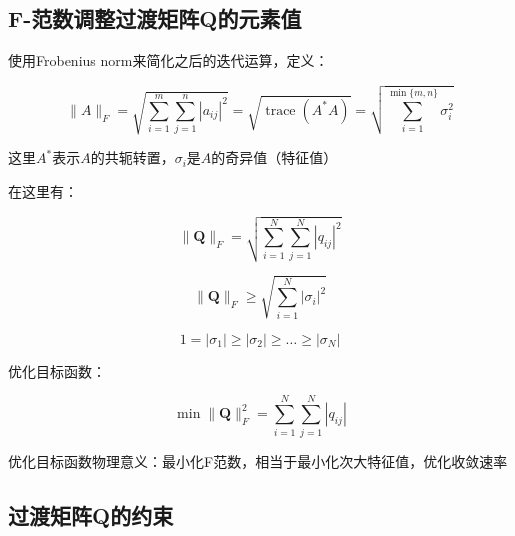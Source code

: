 \subsection{F-范数调整过渡矩阵Q的元素值}


使用Frobenius norm来简化之后的迭代运算，定义：

\begin{equation}
    \|A\|_{F}=\sqrt{\sum_{i=1}^{m} \sum_{j=1}^{n}\left|a_{i j}\right|^{2}}=\sqrt{\operatorname{trace}\left(A^{*} A\right)}=\sqrt{\sum_{i=1}^{\min \{m, n\}} \sigma_{i}^{2}}
\end{equation}

这里$A^*$表示$A$的共轭转置，$σ_i$是$A$的奇异值（特征值）



在这里有：

\begin{equation}
    \|\mathbf{Q}\|_{F}=\sqrt{\sum_{i=1}^{N} \sum_{j=1}^{N}\left|q_{i j}\right|^{2}}
\end{equation}

\begin{equation}
    \|\mathbf{Q}\|_{F} \geq \sqrt{\sum_{i=1}^{N}\left|\sigma_{i}\right|^{2}}
\end{equation}

\begin{equation}
    1=\left|\sigma_{1}\right| \geq\left|\sigma_{2}\right| \geq \ldots \geq\left|\sigma_{N}\right|
\end{equation}

优化目标函数：

\begin{equation}
    \min \|\mathbf{Q}\|_{F}^{2}=\sum_{i=1}^{N} \sum_{j=1}^{N}\left|q_{i j}\right|
\end{equation}

优化目标函数物理意义：最小化F范数，相当于最小化次大特征值，优化收敛速率

\subsection{过渡矩阵Q的约束}


